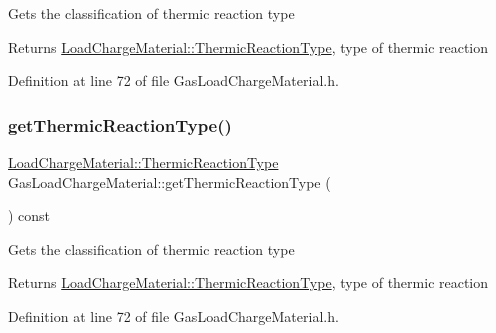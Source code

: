 Gets the classification of thermic reaction type

\begin{DoxyReturn}{Returns}
\hyperlink{class_load_charge_material_a51d4263e865a5d86236622dd3fe23fd1}{Load\+Charge\+Material\+::\+Thermic\+Reaction\+Type}, type of thermic reaction 
\end{DoxyReturn}


Definition at line 72 of file Gas\+Load\+Charge\+Material.\+h.

\mbox{\label{class_gas_load_charge_material_ac801f30ccf58ce98fdb6b8cdb0a9767f}} 
\subsubsection{\texorpdfstring{get\+Thermic\+Reaction\+Type()}{getThermicReactionType()}\hspace{0.1cm}{\footnotesize\ttfamily [3/3]}}
{\footnotesize\ttfamily \hyperlink{class_load_charge_material_a51d4263e865a5d86236622dd3fe23fd1}{Load\+Charge\+Material\+::\+Thermic\+Reaction\+Type} Gas\+Load\+Charge\+Material\+::get\+Thermic\+Reaction\+Type (\begin{DoxyParamCaption}{ }\end{DoxyParamCaption}) const\hspace{0.3cm}{\ttfamily [inline]}}

Gets the classification of thermic reaction type

\begin{DoxyReturn}{Returns}
\hyperlink{class_load_charge_material_a51d4263e865a5d86236622dd3fe23fd1}{Load\+Charge\+Material\+::\+Thermic\+Reaction\+Type}, type of thermic reaction 
\end{DoxyReturn}


Definition at line 72 of file Gas\+Load\+Charge\+Material.\+h.

\mbox{\label{class_gas_load_charge_material_a4f831537652ca09c4539982c626cc164}} 
